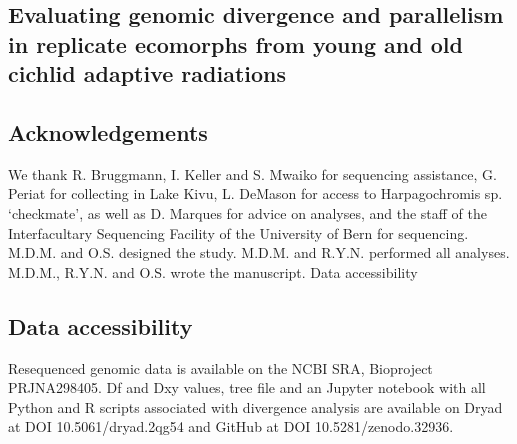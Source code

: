 \begin{refsection}

\chapter{Evaluating genomic divergence and parallelism in replicate ecomorphs from young and old cichlid adaptive radiations}








\section{Acknowledgements}

We thank R. Bruggmann, I. Keller and S. Mwaiko for sequencing assistance, G. Periat for collecting in Lake Kivu, L. DeMason for access to Harpagochromis sp. ‘checkmate’, as well as D. Marques for advice on analyses, and the staff of the Interfacultary Sequencing Facility of the University of Bern for sequencing.
M.D.M. and O.S. designed the study. M.D.M. and R.Y.N. performed all analyses. M.D.M., R.Y.N. and O.S. wrote the manuscript.
Data accessibility

\section{Data accessibility}

Resequenced genomic data is available on the NCBI SRA, Bioproject PRJNA298405. Df and Dxy values, tree file and an Jupyter notebook with all Python and R scripts associated with divergence analysis are available on Dryad at DOI 10.5061/dryad.2qg54 and GitHub at DOI 10.5281/zenodo.32936.

\printbibliography[heading=subbibliography]

\end{refsection}